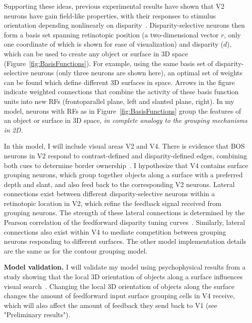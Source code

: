 \documentclass[11pt,notitlepage]{article}
\begin{document}
Supporting these ideas, previous experimental results have shown that
V2 neurons have gain field-like properties, with their responses to
stimulus orientation depending nonlinearly on
disparity~\citep{vonderHeydt_etal00a}. Disparity-selective neurons
then form a basis set spanning retinotopic position (a two-dimensional
vector $r$, only one coordinate of which is shown for ease of visualization)
and disparity ($d$), which can be used to create any object or surface
in 3D space (Figure~\ref{fig:BasisFunctions}). For example, using the
same basis set of disparity-selective neurons (only three neurons are
shown here), an optimal set of weights can be found which define
different 3D surfaces in space. Arrows in the figure indicate weighted
connections that combine the activity of these basis function units
into new RFs (frontoparallel plane, left and slanted plane, right). In
my model, neurons with RFs as in Figure~\ref{fig:BasisFunctions} group
the features of an object or surface in 3D space, {\em in complete analogy
to the grouping mechanisms in 2D.}

In this model, I will include visual areas V2 and V4. There is
evidence that BOS 
neurons in V2 respond to contrast-defined and disparity-defined edges,
combining both cues to determine border
ownership~\citep{Qiu_vonderHeydt05}. I hypothesize that V4 contains surface grouping
neurons, which group together objects along a surface with a preferred
depth and slant, and also feed back to the corresponding V2
neurons. Lateral connections exist between different
disparity-selective neurons within a retinotopic location in V2, which
refine the feedback signal received from grouping neurons. The
strength of these lateral connections is determined by the Pearson
correlation of the feedforward disparity tuning
curves~\citep{Samonds_etal13}. Similarly, lateral connections also
exist within V4 to mediate competition between grouping neurons
responding to different surfaces. The other model implementation
details are the same as for the contour grouping model. 

\textbf{Model validation.} I will validate my model using
psychophysical results from a study showing that the local 3D
orientation of objects along a surface influences visual
search~\citep{He_Nakayama95}. Changing the local 3D orientation of
objects along the surface changes the amount of feedforward input
surface grouping cells in V4 receive, which will also affect the
amount of feedback they send back to V1 (see "Preliminary results"). 
\end{document}
